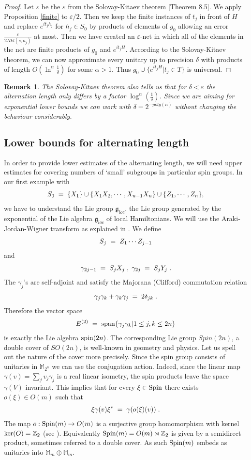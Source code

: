 \documentclass[12pt, a4-paper]{amsart}
\numberwithin{equation}{section}
\newcommand{\lel}{\pl = \pl}
\newcommand{\zz}{{\mathbb Z}}
\newcommand{\pl}{\hspace{.1cm}}
\newcommand{\al}{\alpha}
\newcommand{\eps}{\varepsilon}
\newcommand{\mz}{{\mathbb M}}
\newtheorem{rem}[lemma]{Remark}
\begin{document}
\begin{proof} Let $\eps$ be the $\eps$ from the Solovay-Kitaev theorem \cite{KSV}[Theorem 8.5]. We apply Proposition \ref{finite} to $\eps/2$. Then we keep the finite instances of $t_j$ in front of $H$ and replace $e^{it_jh_j}$ for $h_j\in S_0$ by products of elements of $g_0$ allowing an error $\frac{\eps}{2Nkl(s,a_j)}$ at most. Then we have created an $\eps$-net in which all of the elements in the net are finite products of $g_0$ and $e^{it_jH}$. According to the Solovay-Kitaev theorem, we can now approximate every unitary up to precision $\delta$ with products of length $O(\ln^{\al} \frac{1}{\delta})$ for some $\al>1$. Thus $g_0\cup \{e^{it_jH}|t_j \in T\}$ is universal.  
\end{proof}

\begin{rem}\label{indep} The Solovay-Kitaev theorem also tells us that for  $\delta<\eps$  the alternation length only differs by a factor $\log^{\al}(\frac{1}{\delta})$. Since we are aiming for exponential lower bounds we can work with $\delta=2^{-poly(n)}$ without changing the behaviour considerably.     
\end{rem}
\subsection{Lower bounds for alternating length}

In order to provide lower estimates of the alternating length, we will need upper estimates for covering numbers of `small' subgroups in particular spin groups. In our first example with 
 \[ S_0 \lel \{X_1\}\cup \{X_1X_2, \cdots, X_{n-1}X_n\} \cup \{Z_1, \cdots, Z_n\}, \] 
we have to understand the Lie group $\mathfrak{g}_{loc}$, the Lie group generated by the exponential of the Lie algebra $\mathfrak{g}_{loc}$ of local Hamiltonians. We will use the Araki-Jordan-Wigner transform as explained in \cite{API}. We define
 \[ S_j\lel Z_1\cdots Z_{j-1} \]
and
 \[ \gamma_{2j-1} \lel S_jX_j \pl ,\pl \gamma_{2j}\lel S_jY_j \pl .\]   
 The $\gamma_j$'s are self-adjoint and satisfy the Majorana (Clifford)  commutation relation 
  \[ \gamma_j\gamma_k+\gamma_k\gamma_j \lel 2\delta_{jk} \pl.\] 
Therefore the vector space
 \[ E^{(2)} \lel {\rm span} \{\gamma_j\gamma_k |1\le j,k\le 2n\} \] 
is exactly the Lie algebra ${\rm spin}(2n)$. The corresponding Lie group $Spin(2n)$, a double cover of $SO(2n)$, is well-known in geometry and physics. Let us spell out the nature of the cover more precisely. Since the spin group consists of unitaries in $\mz_{2^n}$ we can use the conjugation action. Indeed, since the linear map $\gamma(v)=\sum_j v_j\gamma_j$ is a real linear isometry, the spin products leave the space $\gamma(V)$ invariant. This implies that for every $\xi\in {\rm Spin}$ there exists $o(\xi)\in O(m)$ such that 
\[ \xi \gamma(v)\xi^* \lel \gamma(o(\xi)(v)) \pl .\]
The map $o:{\rm Spin}(m)\to O(m)$ is a surjective group homomorphism with kernel ${\rm ker}(O)=\zz_2$ (see \cite{Gar}). Equivalently ${\rm Spin}(m)=O(m)\rtimes \zz_2$ is given by a semidirect product, sometimes referred to a double cover. As such ${\rm Spin}(m)$ embeds as  unitaries into $\mz_m\oplus \mz_m$.  
\end{document}
